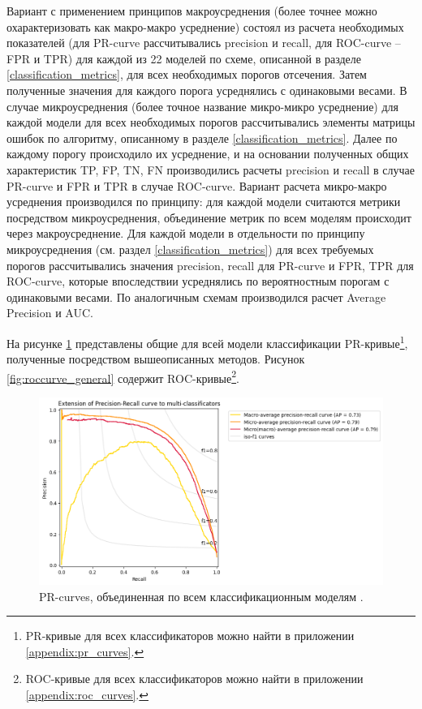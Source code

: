 \documentclass[a4paper,12pt]{extarticle}
\begin{document}
Вариант с применением принципов макроусреднения (более точнее можно охарактеризовать как макро-макро усреднение) состоял из расчета необходимых показателей (для PR-curve рассчитывались precision и recall, для ROC-curve – FPR и TPR) для каждой из 22 моделей по схеме, описанной в разделе \ref{classification_metrics}, для всех необходимых порогов отсечения. Затем полученные значения для каждого порога усреднялись с одинаковыми весами. В случае микроусреднения (более точное название микро-микро усреднение) для каждой модели для всех необходимых порогов рассчитывались элементы матрицы ошибок по алгоритму, описанному в разделе \ref{classification_metrics}. Далее по каждому порогу происходило их усреднение, и на основании полученных общих характеристик TP, FP, TN, FN производились расчеты precision и recall в случае PR-curve и FPR и TPR в случае ROC-curve. Вариант расчета микро-макро усреднения производился по принципу: для каждой модели считаются метрики посредством микроусреднения, объединение метрик по всем моделям происходит через макроусреднение. Для каждой модели в отдельности по принципу микроусреднения (см. раздел \ref{classification_metrics}) для всех требуемых порогов рассчитывались значения precision, recall для PR-curve и FPR, TPR для ROC-curve, которые впоследствии усреднялись по вероятностным порогам с одинаковыми весами. По аналогичным схемам производился расчет Average Precision и AUC. 

На рисунке \ref{fig:prcurve_general} представлены общие для всей модели классификации PR-кривые\footnote{PR-кривые для всех классификаторов можно найти в приложении \ref{appendix:pr_curves}.}, полученные посредством вышеописанных методов. Рисунок \ref{fig:roccurve_general} содержит ROC-кривые\footnote{ROC-кривые для всех классификаторов можно найти в приложении \ref{appendix:roc_curves}.}.

\begin{figure}[ht]
	\centering
	\includegraphics[scale=0.7]{pr_curves/prcurve_general.png}
	\caption{PR-curves, объединенная по всем классификационным моделям .}
	\label{fig:prcurve_general}
\end{figure}
\end{document}
